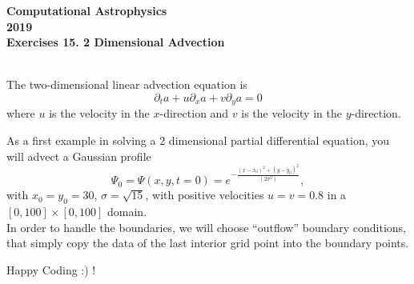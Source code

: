 \documentclass[11pt]{article}
\begin{document}
\begin{center}
\large \bf Computational Astrophysics \rm \\
2019\\
{\small Exercises 15. 2 Dimensional Advection}
\end{center}

\\
The two-dimensional linear advection equation is
\begin{equation}
\partial_t a + u \partial_x a + v \partial_y a = 0
\label{eq:advect2d}
\end{equation}
where $u$ is the velocity in the $x$-direction and $v$ is the velocity in
the $y$-direction. 

As a first example in solving  a 2 dimensional partial differential equation, you will advect a Gaussian profile
\begin{equation}
 \Psi_0 = \Psi(x,y,t=0) = e^{-\frac{(x-x_0)^2 + (y-y_0)^2 }{(2 \sigma^2)}},
 \end{equation}
with $x_0 = y_0= 30$, $\sigma = \sqrt{15}$, with positive
velocities $ u = v = 0.8$ in a $[0,100] \times [0,100]$ domain.\\ 
In order to handle the boundaries, we will choose ``outflow'' boundary
conditions, that simply copy the data of the last interior grid point into the
boundary points.




Happy Coding :) !
\end{document}

